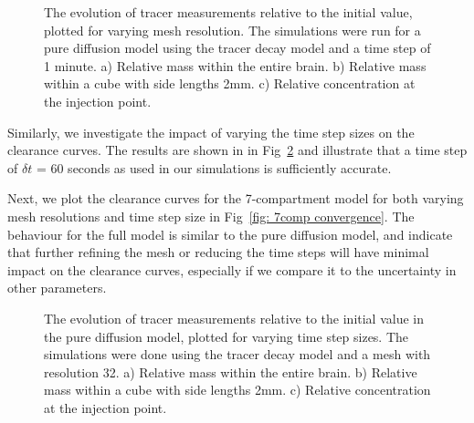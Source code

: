 \documentclass[10pt]{article}
\newcommand{\1}{^{(1)}}
\newcommand{\2}{^{(2)}}
\begin{document}
\begin{figure}
    \centering
    \caption{The evolution of tracer measurements relative to the initial value, plotted for varying mesh resolution. The simulations were run for a pure diffusion model using the tracer decay model and a time step of 1 minute. a) Relative mass within the entire brain. b) Relative mass within a cube with side lengths 2mm. c) Relative concentration at the injection point.}
    \label{fig: diffusion mesh resolution}
\end{figure}

Similarly, we investigate the impact of varying the time step sizes on the clearance curves. The results are shown in  in Fig~\ref{fig: diffusion time step size} and illustrate that a time step of $\delta t$ = 60 seconds as used in our simulations is sufficiently accurate.

Next, we plot the clearance curves for the 7-compartment model for both varying mesh resolutions and time step size in Fig~\ref{fig: 7comp convergence}. The behaviour for the full model is similar to the pure diffusion model, and indicate that further refining the mesh or reducing the time steps will have minimal impact on the clearance curves, especially if we compare it to the uncertainty in other parameters.

\begin{figure}
    \centering
    \caption{The evolution of tracer measurements relative to the initial value in the pure diffusion model, plotted for varying time step sizes. The simulations were done using the tracer decay model and a mesh with resolution 32. a) Relative mass within the entire brain. b) Relative mass within a cube with side lengths 2mm. c) Relative concentration at the injection point.}
    \label{fig: diffusion time step size}
\end{figure}
\end{document}
